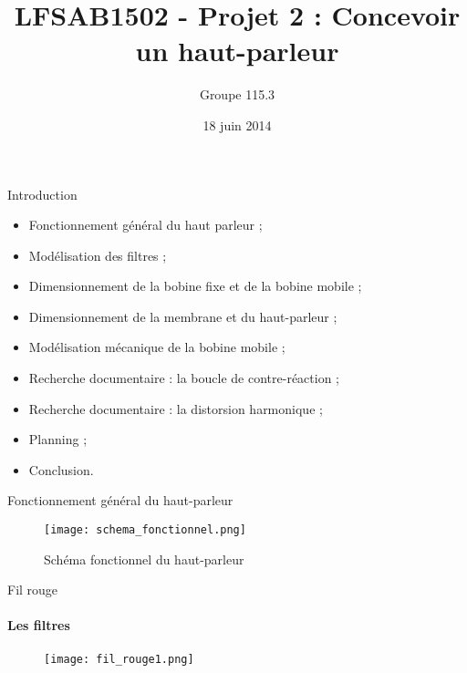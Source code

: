 \documentclass[pdf]{beamer}
\title{LFSAB1502 - Projet 2 : Concevoir un haut-parleur}
\author{Groupe 115.3}
\date{18 juin 2014}
\begin{document}
\begin{frame}
\titlepage
\end{frame}

\begin{frame}{Introduction}
	\begin{itemize}
		\item Fonctionnement général du haut parleur ;
		\item Modélisation des filtres ;
 		\item Dimensionnement de la bobine fixe et de la bobine
 		mobile ;
 		\item Dimensionnement de la membrane et du haut-parleur ;
 		\item Modélisation mécanique de la bobine mobile ;
 		\item Recherche documentaire : la boucle de contre-réaction ;
		\item Recherche documentaire : la distorsion harmonique ;
 		\item Planning ;
 		\item Conclusion.
	\end{itemize}
\end{frame}

\begin{frame}{Fonctionnement général du haut-parleur}
\begin{figure}[ht!]
    \centering
    \texttt{[image: schema\_fonctionnel.png]}
    \caption{Schéma fonctionnel du haut-parleur}
    \label{schema_fonctionnel}
\end{figure}
\end{frame}

\begin{frame}{Fil rouge}
\framesubtitle{Les filtres}
\begin{figure}[ht!]
    \centering
    \texttt{[image: fil\_rouge1.png]}
\end{figure}
\end{frame}
\end{document}
